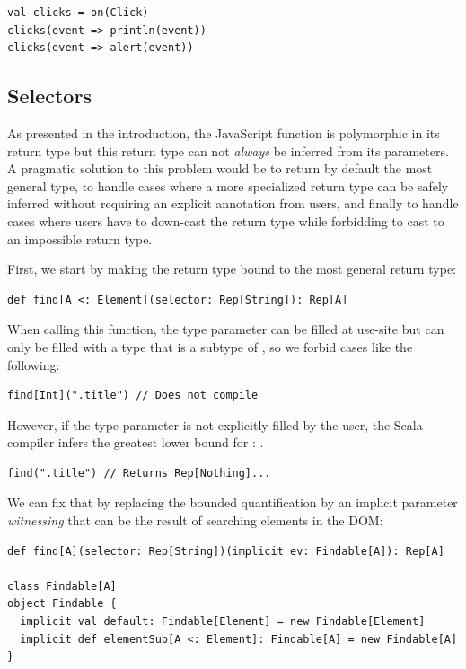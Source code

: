 \documentclass[runningheads,a4paper]{llncs}
\begin{document}
\begin{lstlisting}
val clicks = on(Click)
clicks(event => println(event))
clicks(event => alert(event))
\end{lstlisting}

\subsection{Selectors}

As presented in the introduction, the JavaScript  function is polymorphic in
its return type but this return type can not \emph{always} be inferred from its parameters. A
pragmatic solution to this problem would be to return by default the most general type, to handle
cases where a more specialized return type can be safely inferred without requiring an explicit
annotation from users, and finally to handle cases where users have to down-cast the return type
while forbidding to cast to an impossible return type.

First, we start by making the return type bound to the most general return type:

\begin{lstlisting}
def find[A <: Element](selector: Rep[String]): Rep[A]
\end{lstlisting}

When calling this function, the  type parameter can be filled at use-site but can only be
filled with a type that is a subtype of , so we forbid cases like the following:

\begin{lstlisting}
find[Int](".title") // Does not compile
\end{lstlisting}

However, if the  type parameter is not explicitly filled by the user, the Scala compiler
infers the greatest lower bound for : .

\begin{lstlisting}
find(".title") // Returns Rep[Nothing]...
\end{lstlisting}

We can fix that by replacing the bounded quantification by an implicit parameter \emph{witnessing}
that  can be the result of searching elements in the DOM:

\begin{lstlisting}
def find[A](selector: Rep[String])(implicit ev: Findable[A]): Rep[A]

class Findable[A]
object Findable {
  implicit val default: Findable[Element] = new Findable[Element]
  implicit def elementSub[A <: Element]: Findable[A] = new Findable[A]
}
\end{lstlisting}
\end{document}
